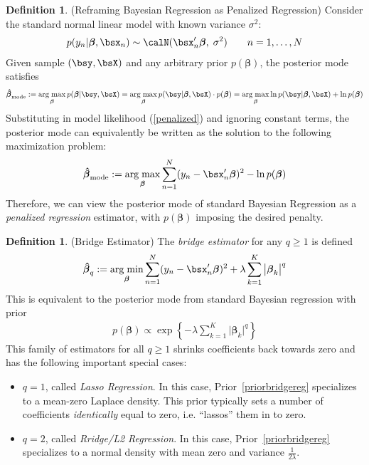 \documentclass[12pt]{article}
\theoremstyle{plain}
\theoremstyle{definition}
\newtheorem{defn}[thm]{Definition}
\theoremstyle{remark}
\newcommand{\bsbeta}{\boldsymbol{\beta}}
\newcommand{\bshatbeta}{\boldsymbol{\hat{\beta}}}
\DeclareMathOperator*{\argmin}{arg\;min}
\DeclareMathOperator*{\argmax}{arg\;max}
\newcommand{\sumnN}{\sum^N_{n=1}}
\begin{document}
\begin{defn}(Reframing Bayesian Regression as Penalized Regression)
Consider the standard normal linear model with known variance
$\sigma^2$:
\begin{align}
  p(y_n|\bsbeta,\bsx_n)
  \sim
  \calN(\bsx_n'\bsbeta,\; \sigma^2)
  \qquad n=1,\ldots,N
  \label{penalized}
\end{align}
Given sample $(\bsy,\bsX)$ and any arbitrary prior $p(\bsbeta)$,
the posterior mode satisfies
\begin{align*}
  \bshatbeta_{\text{mode}}
  :=
  \argmax_{\bsbeta}
  p(\bsbeta|\bsy,\bsX)
  =
  \argmax_{\bsbeta}
  p(\bsy|\bsbeta,\bsX)\cdot p(\bsbeta)
  =
  \argmax_{\bsbeta}
  \ln p(\bsy|\bsbeta,\bsX)
  + \ln p(\bsbeta)
\end{align*}
Substituting in model likelihood (\ref{penalized}) and ignoring constant
terms, the posterior mode can equivalently be written as the solution to
the following maximization problem:
\begin{align*}
  \bshatbeta_{\text{mode}}
  :=
  \argmax_{\bsbeta}
  \sumnN (y_n-\bsx_n'\bsbeta)^2
  - \ln p(\bsbeta)
\end{align*}
Therefore, we can view the posterior mode of standard Bayesian
Regression as a \emph{penalized regression} estimator, with $p(\bsbeta)$
imposing the desired penalty.
\end{defn}

\begin{defn}(Bridge Estimator)
The \emph{bridge estimator} for any $q\geq 1$ is defined
\begin{align*}
  \bshatbeta_q
  :=
  \argmin_{\bsbeta}
  \sumnN
  (y_n-\bsx_n'\bsbeta)^2
  +
  \lambda
  \sum^K_{k=1} \big|\bsbeta_k\big|^q
\end{align*}
This is equivalent to the posterior mode from standard Bayesian
regression with prior
\begin{align}
   p(\bsbeta) \propto \exp\left\{
    -\lambda
    \sum^K_{k=1} \big|\bsbeta_k\big|^q
  \right\}
  \label{priorbridgereg}
\end{align}
This family of estimators for all $q\geq 1$ shrinks coefficients back
towards zero and has the following important special cases:
\begin{itemize}
  \item $q=1$, called \emph{Lasso Regression}.
    In this case, Prior~\ref{priorbridgereg} specializes to a mean-zero
    Laplace density.
    This prior typically sets a number of coefficients
    \emph{identically} equal to zero, i.e. ``lassos'' them in to zero.

  \item $q=2$, called \emph{Rridge/L2 Regression}. In this case,
    Prior~\ref{priorbridgereg} specializes to a normal density with mean
    zero and variance $\frac{1}{2\lambda}$.
\end{itemize}
\end{defn}
\end{document}
